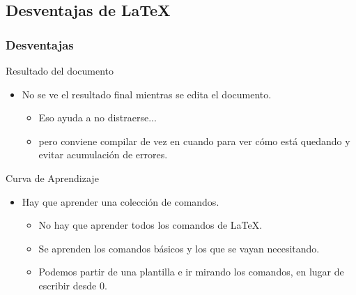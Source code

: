 \documentclass[aspectratio=43]{beamer}%
\begin{document}
\subsection{Desventajas de \LaTeX{}}
 \begin{frame}[fragile]
\frametitle{\textbf{Desventajas}}
\justifying
\begin{block}{Resultado del documento}
\begin{itemize}\justifying
  \item No se ve el resultado final mientras se edita el documento.
  \begin{itemize}\justifying
  \item Eso ayuda a no distraerse...
  \item pero conviene compilar de vez en cuando para ver cómo está quedando y evitar acumulación de errores.
\end{itemize}

\end{itemize}
	
\end{block}
\begin{block}{Curva de Aprendizaje}
\begin{itemize}\justifying
  \item Hay que aprender una colección de comandos.
  \begin{itemize}\justifying
  \item No hay que aprender todos los comandos de \LaTeX{}.
  \item Se aprenden los comandos básicos y los que se vayan necesitando.
  \item Podemos partir de una plantilla e ir mirando los comandos, en lugar de escribir desde 0.
\end{itemize}
\end{itemize}
\end{block}
\end{frame}
\end{document}

